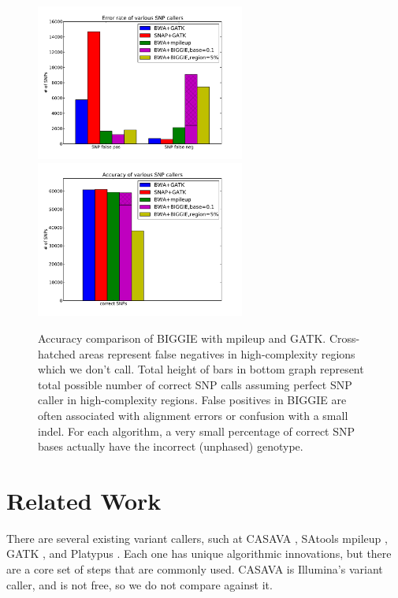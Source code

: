 \documentclass[10pt]{article}
\begin{document}
\begin{figure}[h!]
	\includegraphics[width=2.7in]{figs/variant_call_results_all.pdf} \hspace{5mm}
	\includegraphics[width=2.7in]{figs/correct_results_all.pdf}
	\caption{Accuracy comparison of BIGGIE with mpileup and GATK.
  Cross-hatched areas represent false negatives in high-complexity regions which we don't call.
  Total height of bars in bottom graph represent total possible number of correct SNP calls assuming perfect SNP caller in high-complexity regions.
  False positives in BIGGIE are often associated with alignment errors or confusion with a small indel.
  For each algorithm, a very small percentage of correct SNP bases actually have the incorrect (unphased) genotype.} %
	\end{figure}


\section{Related Work}
\label{sec:relatedWork}

There are several existing variant callers, such at CASAVA \cite{casava}, SAtools mpileup \cite{samtools}, GATK \cite{gatk}, and Platypus \cite{platypus}. Each one has unique algorithmic innovations, but there are a core set of steps that are commonly used. CASAVA is Illumina's variant caller, and is not free, so we do not compare against it.
\end{document}
